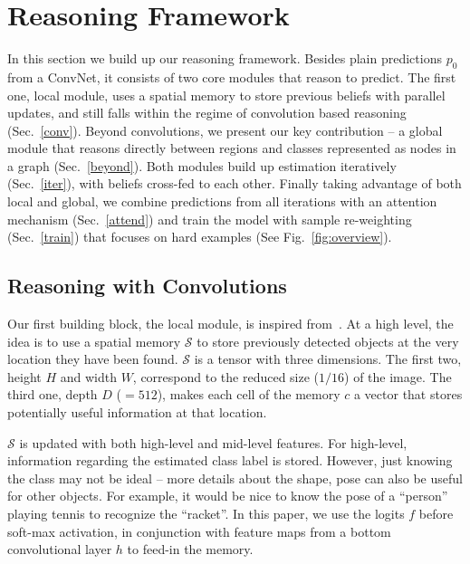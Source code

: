 \documentclass[10pt,twocolumn,letterpaper]{article}
\begin{document}
\section{Reasoning Framework}
\vspace{-0.05in}
In this section we build up our reasoning framework. Besides plain predictions $p_0$ from a ConvNet, it consists of two core modules that reason to predict. The first one, local module, uses a spatial memory to store previous beliefs with parallel updates, and still falls within the regime of convolution based reasoning (Sec.~\ref{conv}). Beyond convolutions, we present our key contribution -- a global module that reasons directly between regions and classes represented as nodes in a graph (Sec.~\ref{beyond}). Both modules build up estimation iteratively (Sec.~\ref{iter}), with beliefs cross-fed to each other. Finally taking advantage of both local and global, we combine predictions from all iterations with an attention mechanism (Sec.~\ref{attend}) and train the model with sample re-weighting (Sec.~\ref{train}) that focuses on hard examples (See Fig.~\ref{fig:overview}).

\subsection{Reasoning with Convolutions\label{conv}}
Our first building block, the local module, is inspired from~\cite{chen2017spatial}. At a high level, the idea is to use a spatial memory $\mathcal{S}$ to store previously detected objects at the very location they have been found. $\mathcal{S}$ is a tensor with three dimensions. The first two, height $H$ and width $W$, correspond to the reduced size ($1/16$) of the image. The third one, depth $D$ (${=}512$), makes each cell of the memory $c$ a vector that stores potentially useful information at that location.

$\mathcal{S}$ is updated with both high-level and mid-level features. For high-level, information regarding the estimated class label is stored. However, just knowing the class may not be ideal -- more details about the shape, pose \etc can also be useful for other objects. For example, it would be nice to know the pose of a ``person'' playing tennis to recognize the ``racket''. In this paper, we use the logits $f$ before soft-max activation, in conjunction with feature maps from a bottom convolutional layer $h$ to feed-in the memory. 
\end{document}
